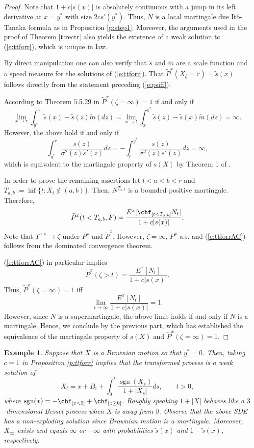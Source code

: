 \documentclass[11pt,reqno]{amsart}
\numberwithin{equation}{section}
\newtheorem{example}{Example}[section]
\DeclareMathOperator{\sgn}{sgn}
\def\rar{\rightarrow}
\begin{document}
\begin{proof}
Note that $1+c|s(x)|$ is absolutely continuous with a jump in its left derivative at $x=y^*$ with size $2cs'(y^*)$. Thus, $N$ is a local martingale due It\^{o}-Tanaka formula as in Proposition \ref{p:step1}. Moreover, the arguments used in the proof of Theorem \ref{t:rectr} also yields the existence of a weak solution to (\ref{e:ttforr}), which is unique in law. 

By direct manipulation one can also verify that $\tilde{s}$ and $\tilde{m}$ are a scale function and a speed measure for the solutions of (\ref{e:ttforr}). That $\tilde{P}^x(X_{\zeta}=r)=\tilde{s}(x)$ follows directly from the statement preceding (\ref{e:psiff}).

According to Theorem 5.5.29  in \cite{KS}  $\tilde{P}^x(\zeta=\infty)=1$ if and only if
\[
\lim_{x\rar r} \int_{y^*}^{x}\tilde{s}(x)-\tilde{s}(z)\tilde{m}(dz)=\lim_{x \rar l}\int_x^{y^*}\tilde{s}(z)-\tilde{s}(x)\tilde{m}(dz)=\infty.
\]
However, the above hold if and only if
\[
\int_{y^*}^{r}\frac{s(z)}{\sigma^2(z)s'(z)}dz=-\int_{l}^{y^*}\frac{s(z)}{\sigma^2(z)s'(z)}dz=\infty,
\]
which is equivalent to the martingale property of $s(X)$ by Theorem 1 of \cite{Kotani}.

In order to prove the remaining assertions let $l<a<b<r$ and $T_{a,b}:=\inf\{t:X_t \notin (a,b)\}$. Then, $N^{T_{a,b}}$ is a bounded positive martingale. Therefore,
\[
\tilde{P}^x(t <T_{a,b}, F)=\frac{E^x[\chf_{[t<T_{a,b}]}N_t]}{1+c|s(x)|}.
\]
Note that $T^{a,b}\rar \zeta$ under $P^x$ and $\tilde{P}^x$. However, $\zeta=\infty, \, P^x$-a.s. and (\ref{e:ttforrAC}) follows from the dominated convergence theorem.

(\ref{e:ttforrAC}) in particular implies
\[
\tilde{P}^x(\zeta>t)=\frac{E^x\left[ N_t\right]}{1+c|s(x)|}.
\]
Thus, $\tilde{P}^x(\zeta=\infty)=1$ iff 
\[
\lim_{t \rar \infty}\frac{E^x\left[ N_t\right]}{1+c|s(x)|}=1.
\]
However, since $N$ is a supermartingale, the above limit holds if and only if $N$ is a martingale. Hence, we conclude by the previous part, which has established the equivalence of the martingale property of $s(X)$ and $\tilde{P}^x(\zeta=\infty)=1$.
\end{proof}
\begin{example} Suppose that $X$ is a Brownian motion so that $y^*=0$. Then, taking $c=1$ in Proposition \ref{p:ttforr} implies that the transformed process is a weak solution of 
\[
X_t=x +B_t +\int_0^t \frac{\sgn(X_s)}{1+|X_s|}ds, \qquad t>0,
\]
where $\sgn(x)=-\chf_{[x<0]}+\chf_{[x\geq 0]}$. Roughly speaking $1+|X|$ behaves like  a $3$-dimensional Bessel process when $X$ is away from $0$. Observe that the above SDE has a non-exploding solution since Brownian motion is a martingale. Moreover, $X_{\infty}$ exists and equals $\infty$ or $-\infty$ with probabilities $\tilde{s}(x)$ and $1-\tilde{s}(x)$, respectively.
\end{example}
\end{document}
